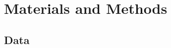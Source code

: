 \documentclass{llncs}
\begin{document}







    
\section{Materials and Methods}

\subsection{Data}
\end{document}
